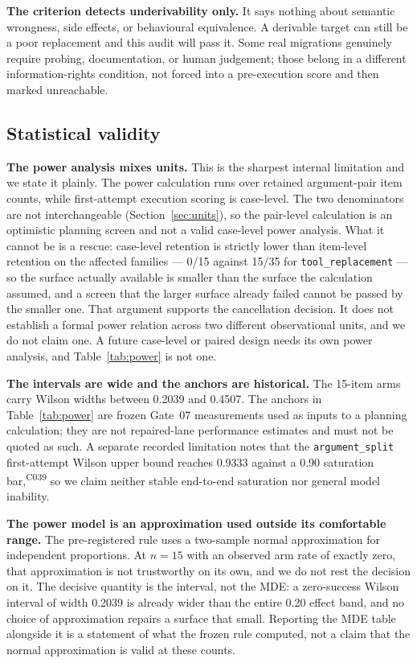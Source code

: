 \documentclass[11pt]{article}
\newcommand{\ledger}[1]{\textsuperscript{\textsf{\scriptsize #1}}}
\newcommand{\dfam}[1]{\texttt{#1}}
\begin{document}
\textbf{The criterion detects underivability only.} It says nothing about
semantic wrongness, side effects, or behavioural equivalence. A derivable
target can still be a poor replacement and this audit will pass it. Some real
migrations genuinely require probing, documentation, or human judgement; those
belong in a different information-rights condition, not forced into a
pre-execution score and then marked unreachable.

\subsection{Statistical validity}

\textbf{The power analysis mixes units.} This is the sharpest internal
limitation and we state it plainly. The power calculation runs over retained
argument-pair item counts, while first-attempt execution scoring is
case-level. The two denominators are not interchangeable
(Section~\ref{sec:units}), so the pair-level calculation is an optimistic
planning screen and not a valid case-level power analysis. What it cannot be is
a rescue: case-level retention is strictly lower than item-level retention on
the affected families --- 0/15 against 15/35 for \dfam{tool\_replacement} ---
so the surface actually available is smaller than the surface the calculation
assumed, and a screen that the larger surface already failed cannot be passed
by the smaller one. That argument supports the cancellation decision. It does
not establish a formal power relation across two different observational units,
and we do not claim one. A future case-level or paired design needs its own
power analysis, and Table~\ref{tab:power} is not one.

\textbf{The intervals are wide and the anchors are historical.} The 15-item
arms carry Wilson widths between 0.2039 and 0.4507. The anchors in
Table~\ref{tab:power} are frozen Gate~07 measurements used as inputs to a
planning calculation; they are not repaired-lane performance estimates and
must not be quoted as such. A separate recorded limitation notes that the
\dfam{argument\_split} first-attempt Wilson upper bound reaches 0.9333 against
a 0.90 saturation bar,\ledger{C039} so we claim neither stable end-to-end
saturation nor general model inability.

\textbf{The power model is an approximation used outside its comfortable
range.} The pre-registered rule uses a two-sample normal approximation for
independent proportions. At $n=15$ with an observed arm rate of exactly zero,
that approximation is not trustworthy on its own, and we do not rest the
decision on it. The decisive quantity is the interval, not the MDE: a
zero-success Wilson interval of width 0.2039 is already wider than the entire
0.20 effect band, and no choice of approximation repairs a surface that small.
Reporting the MDE table alongside it is a statement of what the frozen rule
computed, not a claim that the normal approximation is valid at these counts.
\end{document}
